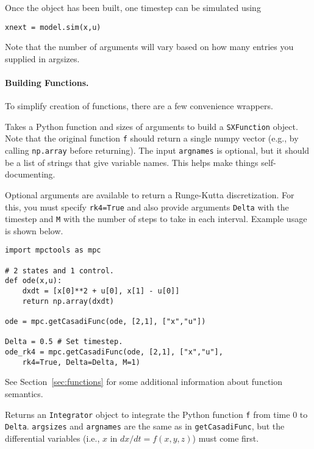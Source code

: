 \documentclass{article}
\begin{document}
\begin{multicols}{2}
Once the object has been built, one timestep can be simulated using
\begin{lstlisting}
xnext = model.sim(x,u)
\end{lstlisting}

Note that the number of arguments will vary based on how many entries you supplied in argsizes.

\paragraph*{Building \casadi{} Functions.}

To simplify creation of \casadi{} functions, there are a few convenience wrappers.


Takes a Python function and sizes of arguments to build a \casadi{} \texttt{SXFunction} object.
Note that the original function \texttt{f} should return a single numpy vector (e.g., by calling \texttt{np.array} before returning).
The input \texttt{argnames} is optional, but it should be a list of strings that give variable names.
This helps make things self-documenting.

Optional arguments are available to return a Runge-Kutta discretization.
For this, you must specify \lstinline|rk4=True| and also provide arguments \texttt{Delta} with the timestep and \texttt{M} with the number of steps to take in each interval.
Example usage is shown below.

\begin{lstlisting}
import mpctools as mpc

# 2 states and 1 control.
def ode(x,u):
    dxdt = [x[0]**2 + u[0], x[1] - u[0]]
    return np.array(dxdt)

ode = mpc.getCasadiFunc(ode, [2,1], ["x","u"])

Delta = 0.5 # Set timestep.
ode_rk4 = mpc.getCasadiFunc(ode, [2,1], ["x","u"],
    rk4=True, Delta=Delta, M=1)
\end{lstlisting}

See Section~\ref{sec:functions} for some additional information about function semantics.


Returns an \texttt{Integrator} object to integrate the Python function \texttt{f} from time 0 to \texttt{Delta}.
\texttt{argsizes} and \texttt{argnames} are the same as in \texttt{getCasadiFunc}, but the differential variables (i.e., $x$ in $dx/dt = f(x,y,z)$) must come first.


\end{multicols}
\end{document}
